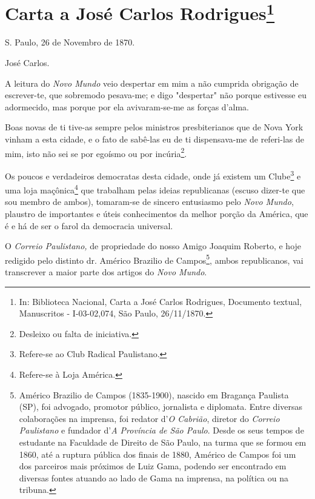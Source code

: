 \chapter{Carta a José Carlos Rodrigues\footnote[*]{In: Biblioteca
  Nacional, Carta a José Carlos Rodrigues, Documento textual,
  Manuscritos - I-03-02,074, São Paulo, 26/11/1870.}}


S. Paulo, 26 de Novembro de 1870.

José Carlos.

A leitura do \emph{Novo Mundo} veio despertar em mim a não cumprida
obrigação de escrever-te, que sobremodo pesava-me; e digo "despertar"
não porque estivesse eu adormecido, mas porque por ela avivaram-se-me as
forças d'alma.

Boas novas de ti tive-as sempre pelos ministros presbiterianos que de
Nova York vinham a esta cidade, e o fato de sabê-las eu de ti
dispensava-me de referi-las de mim, isto não sei se por egoísmo ou por
incúria\footnote{Desleixo ou falta de iniciativa.}.

Os poucos e verdadeiros democratas desta cidade, onde já existem um
Clube\footnote{Refere-se ao Club Radical Paulistano.} e uma loja
maçônica\footnote{Refere-se à Loja América.} que trabalham pelas
ideias republicanas (escuso dizer-te que sou membro de ambos),
tomaram-se de sincero entusiasmo pelo \emph{Novo Mundo}, plaustro de
importantes e úteis conhecimentos da melhor porção da América, que é e
há de ser o farol da democracia universal.

O \emph{Correio Paulistano,} de propriedade do nosso Amigo Joaquim
Roberto, e hoje redigido pelo distinto dr. Américo Brazilio de
Campos\footnote{Américo Brazilio de Campos (1835-1900), nascido em
  Bragança Paulista (SP), foi advogado, promotor público, jornalista e
  diplomata. Entre diversas colaborações na imprensa, foi redator
  d'\emph{O Cabrião}, diretor do \emph{Correio Paulistano} e fundador
  d'\emph{A Província de São Paulo}. Desde os seus tempos de estudante
  na Faculdade de Direito de São Paulo, na turma que se formou em 1860,
  até a ruptura pública dos finais de 1880, Américo de Campos foi um dos
  parceiros mais próximos de Luiz Gama, podendo ser encontrado em
  diversas fontes atuando ao lado de Gama na imprensa, na política ou na
  tribuna.}, ambos republicanos, vai transcrever a maior parte dos
artigos do \emph{Novo Mundo}.


